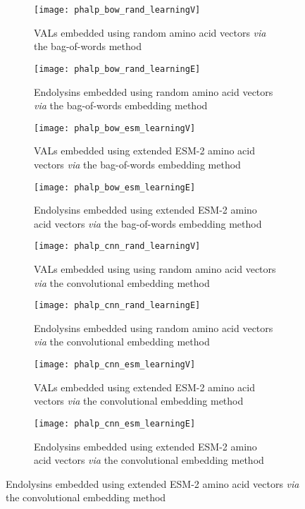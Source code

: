 \begin{figure}[htbp]
    \centering
    \begin{subfigure}{0.48\textwidth}
        \texttt{[image: phalp\_bow\_rand\_learningV]}
        \caption{VALs embedded using random amino acid vectors \textit{via} the bag-of-words method}
        \label{fig:subfig-a}
    \end{subfigure}
    \hfill
    \begin{subfigure}{0.48\textwidth}
        \texttt{[image: phalp\_bow\_rand\_learningE]}
        \caption{Endolysins embedded using random amino acid vectors \textit{via} the bag-of-words embedding method}
        \label{fig:subfig-b}
    \end{subfigure}
    
    \begin{subfigure}{0.48\textwidth}
        \texttt{[image: phalp\_bow\_esm\_learningV]}
        \caption{VALs embedded using extended ESM-2 amino acid vectors \textit{via} the bag-of-words embedding method}
        \label{fig:subfig-c}
    \end{subfigure}
    \hfill
    \begin{subfigure}{0.48\textwidth}
        \texttt{[image: phalp\_bow\_esm\_learningE]}
        \caption{Endolysins embedded using extended ESM-2 amino acid vectors \textit{via} the bag-of-words embedding method}
        \label{fig:subfig-d}
    \end{subfigure}
    
    \begin{subfigure}{0.48\textwidth}
        \texttt{[image: phalp\_cnn\_rand\_learningV]}
        \caption{VALs embedded using using random amino acid vectors \textit{via} the convolutional embedding method}
        \label{fig:subfig-e}
    \end{subfigure}
    \hfill
    \begin{subfigure}{0.48\textwidth}
        \texttt{[image: phalp\_cnn\_rand\_learningE]}
        \caption{Endolysins embedded using random amino acid vectors \textit{via} the convolutional embedding method}
        \label{fig:subfig-f}
    \end{subfigure}
    
    \begin{subfigure}{0.48\textwidth}
        \texttt{[image: phalp\_cnn\_esm\_learningV]}
        \caption{VALs embedded using extended ESM-2 amino acid vectors \textit{via} the convolutional embedding method}
        \label{fig:subfig-g}
    \end{subfigure}
    \hfill
    \begin{subfigure}{0.48\textwidth}
        \texttt{[image: phalp\_cnn\_esm\_learningE]}
        \caption{Endolysins embedded using extended ESM-2 amino acid vectors \textit{via} the convolutional embedding method}
        \label{fig:subfig-h}
    \end{subfigure}
    

\end{figure}
